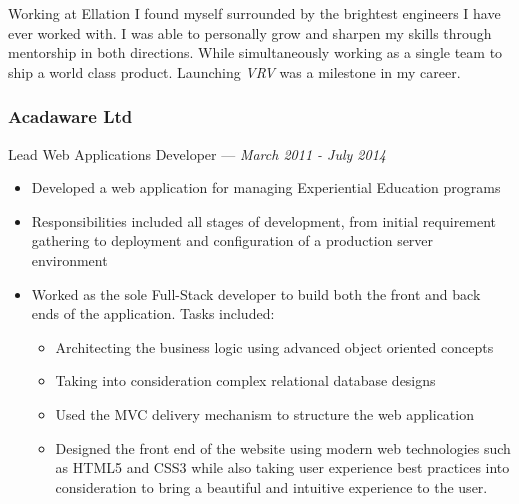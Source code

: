 \documentclass[letterpaper,10pt]{article}
\providecommand{\tightlist}
  {\setlength{\itemsep}{4pt}\setlength{\parskip}{0pt}}
\begin{document}
Working at Ellation I found myself surrounded by the brightest engineers
I have ever worked with. I was able to personally grow and sharpen my
skills through mentorship in both directions. While simultaneously
working as a single team to ship a world class product. Launching
\emph{VRV} was a milestone in my career.

\subsubsection{Acadaware Ltd}
\hfill Lead Web Applications Developer --- \emph{March 2011 - July 2014}

\begin{itemize}
\tightlist
\item
  Developed a web application for managing Experiential Education
  programs
\item
  Responsibilities included all stages of development, from initial
  requirement gathering to deployment and configuration of a production
  server environment
\item
  Worked as the sole Full-Stack developer to build both the front and
  back ends of the application. Tasks included:

  \begin{itemize}
  \tightlist
  \item
    Architecting the business logic using advanced object oriented
    concepts
  \item
    Taking into consideration complex relational database designs
  \item
    Used the MVC delivery mechanism to structure the web application
  \item
    Designed the front end of the website using modern web technologies
    such as HTML5 and CSS3 while also taking user experience best
    practices into consideration to bring a beautiful and intuitive
    experience to the user.
  \end{itemize}
\end{itemize}
\end{document}
